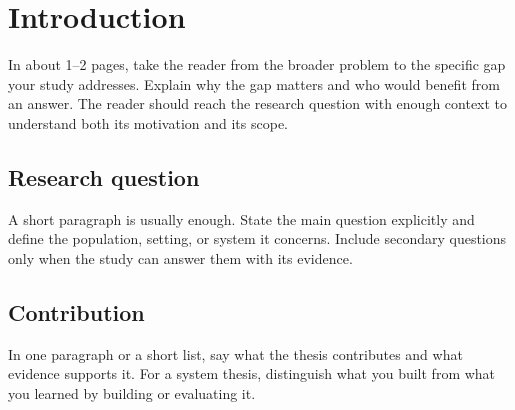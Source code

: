 \chapter{Introduction}
\label{chap:introduction}

In about 1--2 pages, take the reader from the broader problem to the specific gap your study addresses. Explain why the gap matters and who would benefit from an answer. The reader should reach the research question with enough context to understand both its motivation and its scope.

\section{Research question}
A short paragraph is usually enough. State the main question explicitly and define the population, setting, or system it concerns. Include secondary questions only when the study can answer them with its evidence.

\section{Contribution}
In one paragraph or a short list, say what the thesis contributes and what evidence supports it. For a system thesis, distinguish what you built from what you learned by building or evaluating it.
